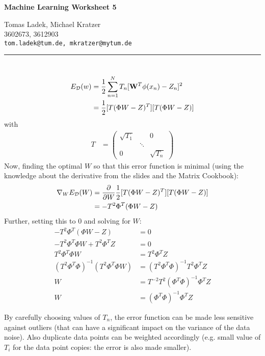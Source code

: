 \documentclass[11pt]{article}
\makeatletter
\newcommand{\exercise}{\section{}}
\newcommand{\hwhead}[4]{
\begin{center}
\sffamily\large\bfseries Machine Learning Worksheet #1
\vspace{2mm}
\normalfont

#2\\
#3\\
\texttt{#4}
\end{center}
\vspace{6mm} \hrule \vspace{4mm}
}
\newcommand{\names}{Tomas Ladek, Michael Kratzer} %
\newcommand{\imats}{3602673, 3612903} %
\newcommand{\emails}{tom.ladek@tum.de, mkratzer@mytum.de} %
\makeatother
\begin{document}
\hwhead{5}{\names}{\imats}{\emails}


\exercise
\begin{align*}
	E_{\cal D}(w) &= \dfrac{1}{2} \sum_{n=1}^N T_n [\mathbf{W}^T \phi(x_n) - Z_n]^2\\
	&= \dfrac{1}{2} [T (\Phi W - Z)^T] [T (\Phi W - Z)]
\end{align*}
with
\begin{align*}
	T &= 
	\begin{pmatrix}
	\sqrt{T_1} & & 0 \\
	 & \ddots & \\
	 0 & & \sqrt{T_n}
	\end{pmatrix}
\end{align*}
Now, finding the optimal $W$ so that this error function is minimal (using the knowledge about the derivative from the slides and the Matrix Cookbook):
\begin{align*}
	\nabla_W E_{\cal D}(W) &= \dfrac{\partial}{\partial W} \dfrac{1}{2} [T (\Phi W - Z)^T] [T (\Phi W - Z)] \\
	&= - T^2 \Phi^T (\Phi W - Z)
\end{align*}
Further, setting this to $0$ and solving for $W$:
\begin{align*}
	- T^2 \Phi^T (\Phi W - Z) &= 0 \\
	- T^2 \Phi^T \Phi W + T^2 \Phi^T Z &= 0 \\
	T^2 \Phi^T \Phi W &= T^2 \Phi^T Z \\
	(T^2 \Phi^T \Phi)^{-1} (T^2 \Phi^T \Phi W) &= (T^2 \Phi^T \Phi)^{-1} T^2 \Phi^T Z \\
	W &= T^{-2} T^2 (\Phi^T \Phi)^{-1} \Phi^T Z \\
	W &= (\Phi^T \Phi)^{-1} \Phi^T Z	
\end{align*}

By carefully choosing values of $T_n$, the error function can be made less sensitive against outliers (that can have a significant impact on the variance of the data noise). Also duplicate data points can be weighted accordingly (e.g. small value of $T_i$ for the data point copies: the error is also made smaller).
\end{document}
